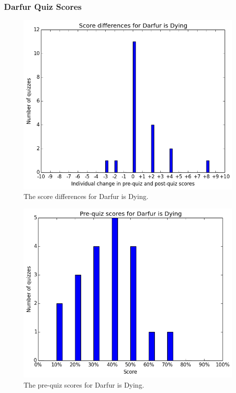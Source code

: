 \cleardoublepage

		\subsubsection{Darfur Quiz Scores}

			\begin{figure}[h!] 
			\centering 
			\includegraphics[height=0.33\textheight]{darfur_results.png} 
			\caption{The score differences for Darfur is Dying.}
			\end{figure}

			\begin{figure}[h!] 
			\centering 
			\includegraphics[height=0.33\textheight]{darfur_pre.png} 
			\caption{The pre-quiz scores for Darfur is Dying.}
			\end{figure}

